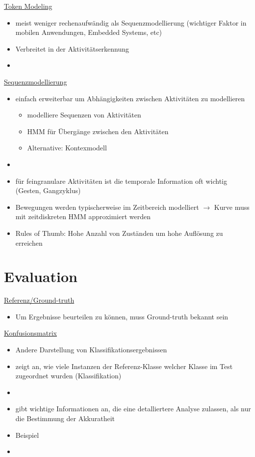 \documentclass[a4paper,10pt,oneside]{article}
\begin{document}
\underline{Token Modeling} \\
 	\begin{itemize}
 		\item meist weniger rechenaufwändig als Sequenzmodellierung (wichtiger Faktor in mobilen Anwendungen, Embedded Systems, etc)
 		\item Verbreitet in der Aktivitätserkennung
 		\item[] %
 	\end{itemize}

\underline{Sequenzmodellierung} \\
 	\begin{itemize}
 		\item einfach erweiterbar um Abhängigkeiten zwischen Aktivitäten zu modellieren
 			\begin{itemize}
 				\item modelliere Sequenzen von Aktivitäten
 				\item HMM für Übergänge zwischen den Aktivitäten
 				\item Alternative: Kontexmodell
 			\end{itemize}
 		\item[] %
 		\item für feingranulare Aktivitäten ist die temporale Information oft wichtig (Gesten, Gangzyklus)
 		\item Bewegungen werden typischerweise im Zeitbereich modelliert $\rightarrow$ Kurve muss mit zeitdiskreten HMM approximiert werden
 		\item Rules of Thumb: Hohe Anzahl von Zuständen um hohe Auflösung zu erreichen
 	\end{itemize}

\section{Evaluation}

\underline{Referenz/Ground-truth} \\
 		\begin{itemize}
 			\item Um Ergebnisse beurteilen zu können, muss Ground-truth bekannt sein
 		\end{itemize}
 		
\underline{Konfusionsmatrix} \\
	\begin{itemize}
		\item Andere Darstellung von Klassifikationsergebnissen
		\item zeigt an, wie viele Instanzen der Referenz-Klasse welcher Klasse im Test zugeordnet wurden (Klassifikation)
		\item[] %
		\item gibt wichtige Informationen an, die eine detalliertere Analyse zulassen, als nur die Bestimmung der Akkuratheit
		\item Beispiel 
		\item[] %
	\end{itemize}
	
\end{document}
